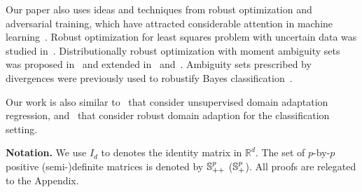 \documentclass{article}
\begin{document}
    
    
    Our paper also uses ideas and techniques from robust optimization and adversarial training, which have attracted considerable attention in machine learning~\citep{ref:namkoong2016stochastic, ref:gao2018robust, ref:blanchet2019robust,ref:nguyen2019calculating}. Robust optimization for least squares problem with uncertain data was studied in~\citet{ref:Ghaoui1997robust}. Distributionally robust optimization with moment ambiguity sets was proposed in~\citet{ref:delage2010distributionally} and extended in~\citet{ref:goh2010distributionally} and~\citet{ref:kuhn2019wasserstein}. Ambiguity sets prescribed by divergences were previously used to robustify Bayes classification~\cite{ref:nguyen2019optimistic,ref:nguyen2020robust}. 
    
    
    Our work is also similar to~\citet{ref:chen2016robust} that consider unsupervised domain adaptation regression, and~\citet{ref:wang2020distributionally} that consider robust domain adaption for the classification setting.
    
   


\textbf{Notation.} We use $I_d$ to denotes the identity matrix in $\mathbb R^d$. The set of $p$-by-$p$ positive (semi-)definite matrices is denoted by $\mathbb{S}_{++}^p$ ($\mathbb{S}_{+}^p$). All proofs are relegated to the Appendix.

\end{document}
